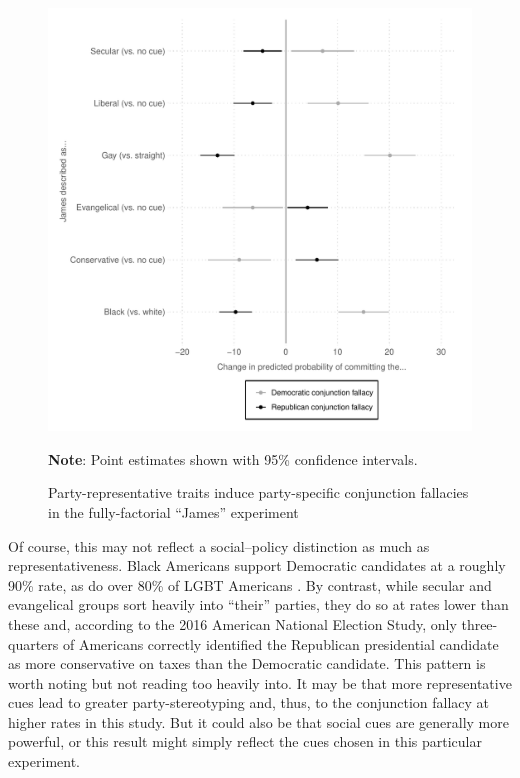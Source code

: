 \documentclass[12pt, letterpaper]{article}
\begin{document}
\begin{figure}
\caption{Party-representative traits induce party-specific conjunction fallacies in the fully-factorial ``James'' experiment}
\label{fig:james_ff}
\begin{center}
\includegraphics[width=1\textwidth]{../figs/fig_3_james_ff.pdf}
\end{center}
\scriptsize{\textbf{Note}: Point estimates shown with 95\% confidence intervals.}
\end{figure}

Of course, this may not reflect a social--policy distinction as much as representativeness. Black Americans support Democratic candidates at a roughly 90\% rate, as do over 80\% of LGBT Americans \citep{fitzsimmons2018record}. By contrast, while secular and evangelical groups sort heavily into ``their'' parties, they do so at rates lower than these \citep{pew_religion} and, according to the 2016 American National Election Study\nocite{ANES}, only three-quarters of Americans correctly identified the Republican presidential candidate as more conservative on taxes than the Democratic candidate. This pattern is worth noting but not reading too heavily into. It may be that more representative cues lead to greater party-stereotyping and, thus, to the conjunction fallacy at higher rates in this study. But it could also be that social cues are generally more powerful, or this result might simply reflect the cues chosen in this particular experiment. 
\end{document}
